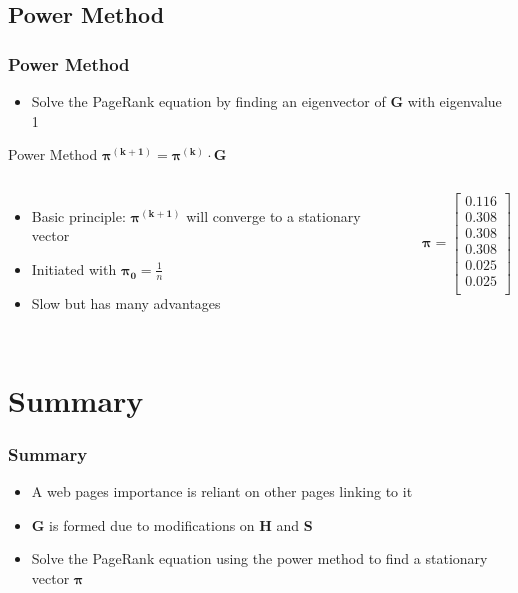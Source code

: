 \documentclass{beamer}
\begin{document}
\subsection{Power Method}
\begin{frame}
\frametitle{Power Method}
\begin{itemize}
\item Solve the PageRank equation by finding an eigenvector of \textbf{G} with eigenvalue 1
\end{itemize}
\begin{block}{Power Method}
$\boldsymbol{\pi^{(k+1)}} = \boldsymbol{\pi^{(k)}}\cdot \textbf{G}$
\end{block}
\begin{columns}[c]
\begin{itemize}
\item Basic principle: $\boldsymbol{\pi^{(k+1)}}$ will converge to a stationary vector
\item Initiated with $\boldsymbol{\pi_{0}} = \frac{1}{n}$
\item Slow but has many advantages
\end{itemize}

\begin{example}
\[\boldsymbol{\pi}=\left[
\begin{array}{c}
0.116\\ 
0.308\\ 
0.308\\ 
0.308\\ 
0.025\\
0.025 \\
\end{array}
\right]	
\]
\end{example}
\end{columns}
\end{frame}


\section{Summary}
\begin{frame}
\frametitle{Summary}
\begin{itemize}
\item A web pages importance is reliant on other pages linking to it
\item \textbf{G} is formed due to modifications on \textbf{H} and \textbf{S}
\item Solve the PageRank equation using the power method to find a stationary vector \(\boldsymbol{\pi}\)
\end{itemize}
\end{frame}
\end{document}
